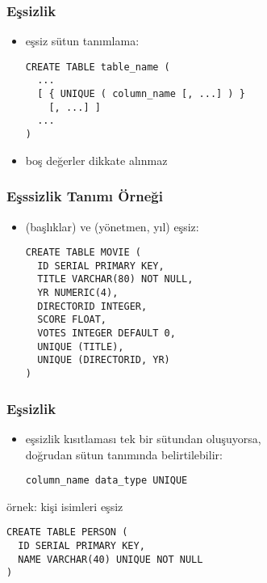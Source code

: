 \documentclass[dvipsnames]{beamer}
\theoremstyle{plain}
\begin{document}
\begin{frame}[fragile]
  \frametitle{Eşsizlik}

  \begin{itemize}
    \item eşsiz sütun tanımlama:
    \begin{lstlisting}
CREATE TABLE table_name (
  ...
  [ { UNIQUE ( column_name [, ...] ) }
    [, ...] ]
  ...
)
    \end{lstlisting}

    \item boş değerler dikkate alınmaz
  \end{itemize}
\end{frame}
\begin{frame}[fragile]
  \frametitle{Eşssizlik Tanımı Örneği}

  \begin{itemize}
    \item (başlıklar) ve (yönetmen, yıl) eşsiz:
    \begin{lstlisting}
CREATE TABLE MOVIE (
  ID SERIAL PRIMARY KEY,
  TITLE VARCHAR(80) NOT NULL,
  YR NUMERIC(4),
  DIRECTORID INTEGER,
  SCORE FLOAT,
  VOTES INTEGER DEFAULT 0,
  UNIQUE (TITLE),
  UNIQUE (DIRECTORID, YR)
)
    \end{lstlisting}
  \end{itemize}
\end{frame}

\begin{frame}[fragile]
  \frametitle{Eşsizlik}

  \begin{itemize}
    \item eşsizlik kısıtlaması tek bir sütundan oluşuyorsa,\\
       doğrudan sütun tanımında belirtilebilir:
    \begin{lstlisting}
column_name data_type UNIQUE
    \end{lstlisting}
  \end{itemize}

  \begin{exampleblock}{örnek: kişi isimleri eşsiz}
    \begin{lstlisting}
CREATE TABLE PERSON (
  ID SERIAL PRIMARY KEY,
  NAME VARCHAR(40) UNIQUE NOT NULL
)
    \end{lstlisting}
  \end{exampleblock}
\end{frame}
\end{document}
